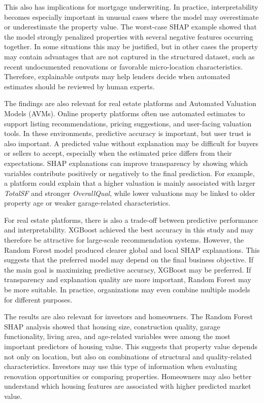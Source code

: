 \documentclass[12pt,a4paper,oneside,openany]{book}
\begin{document}
This also has implications for mortgage underwriting. In practice, interpretability becomes especially important in unusual cases where the model may overestimate or underestimate the property value. The worst-case SHAP example showed that the model strongly penalized properties with several negative features occurring together. In some situations this may be justified, but in other cases the property may contain advantages that are not captured in the structured dataset, such as recent undocumented renovations or favorable micro-location characteristics. Therefore, explainable outputs may help lenders decide when automated estimates should be reviewed by human experts.

The findings are also relevant for real estate platforms and Automated Valuation Models (AVMs). Online property platforms often use automated estimates to support listing recommendations, pricing suggestions, and user-facing valuation tools. In these environments, predictive accuracy is important, but user trust is also important. A predicted value without explanation may be difficult for buyers or sellers to accept, especially when the estimated price differs from their expectations. SHAP explanations can improve transparency by showing which variables contribute positively or negatively to the final prediction. For example, a platform could explain that a higher valuation is mainly associated with larger \textit{TotalSF} and stronger \textit{OverallQual}, while lower valuations may be linked to older property age or weaker garage-related characteristics.

For real estate platforms, there is also a trade-off between predictive performance and interpretability. XGBoost achieved the best accuracy in this study and may therefore be attractive for large-scale recommendation systems. However, the Random Forest model produced clearer global and local SHAP explanations. This suggests that the preferred model may depend on the final business objective. If the main goal is maximizing predictive accuracy, XGBoost may be preferred. If transparency and explanation quality are more important, Random Forest may be more suitable. In practice, organizations may even combine multiple models for different purposes.

The results are also relevant for investors and homeowners. The Random Forest SHAP analysis showed that housing size, construction quality, garage functionality, living area, and age-related variables were among the most important predictors of housing value. This suggests that property value depends not only on location, but also on combinations of structural and quality-related characteristics. Investors may use this type of information when evaluating renovation opportunities or comparing properties. Homeowners may also better understand which housing features are associated with higher predicted market value.
\end{document}
